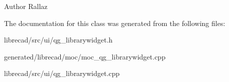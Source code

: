 \begin{DoxyAuthor}{Author}
Rallaz 
\end{DoxyAuthor}


The documentation for this class was generated from the following files\-:\begin{DoxyCompactItemize}
\item 
librecad/src/ui/qg\-\_\-librarywidget.\-h\item 
generated/librecad/moc/moc\-\_\-qg\-\_\-librarywidget.\-cpp\item 
librecad/src/ui/qg\-\_\-librarywidget.\-cpp\end{DoxyCompactItemize}

